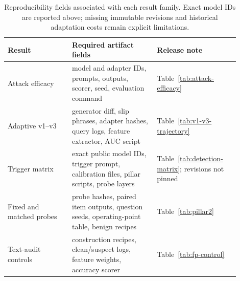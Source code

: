 \documentclass{article}
\begin{document}
\begin{table}[h]
\begin{center}
\small
\begin{tabular}{@{}p{0.25\linewidth}p{0.33\linewidth}p{0.32\linewidth}@{}}
\toprule
\textbf{Result} & \textbf{Required artifact fields} & \textbf{Release note} \\
\midrule
Attack efficacy & model and adapter IDs, prompts, outputs, scorer, seed, evaluation command & Table~\ref{tab:attack-efficacy} \\
Adaptive v1--v3 & generator diff, slip phrases, adapter hashes, query logs, feature extractor, AUC script & Table~\ref{tab:v1-v3-trajectory} \\
Trigger matrix & exact public model IDs, trigger prompt, calibration files, pillar scripts, probe layers & Table~\ref{tab:detection-matrix}; revisions not pinned \\
Fixed and matched probes & probe hashes, paired item outputs, question seeds, operating-point table, benign recipes & Table~\ref{tab:pillar2} \\
Text-audit controls & construction recipes, clean/suspect logs, feature weights, accuracy scorer & Table~\ref{tab:fp-control} \\
\bottomrule
\end{tabular}
\end{center}
\caption{Reproducibility fields associated with each result family. Exact model IDs are reported above; missing immutable revisions and historical adaptation costs remain explicit limitations.}
\label{tab:artifact-checklist}
\end{table}
\end{document}
